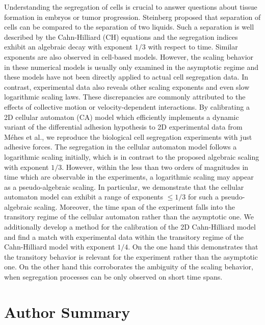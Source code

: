 \documentclass[10pt,letterpaper]{article}
\begin{document}
Understanding the segregation of cells is crucial to answer questions
about tissue formation in embryos or tumor progression. Steinberg
proposed that separation of cells can be compared to the separation of
two liquids. Such a separation is well described by the Cahn-Hilliard
(CH) equations and the segregation indices exhibit an algebraic decay
with exponent $1/3$ with respect to time. Similar exponents are also
observed in cell-based models. However, the scaling behavior in these
numerical models is usually only examined in the asymptotic regime and
these models have not been directly applied to actual cell segregation
data. In contrast, experimental data also reveals other scaling
exponents and even slow logarithmic scaling laws. These discrepancies
are commonly attributed to the effects of collective motion or
velocity-dependent interactions. By calibrating a 2D cellular automaton
(CA) model which efficiently implements a dynamic variant of the
differential adhesion hypothesis to 2D experimental data from Méhes et
al., we reproduce the biological cell segregation experiments with
just adhesive forces. The segregation in the cellular automaton model follows a
logarithmic scaling initially, which is in contrast to the proposed algebraic
scaling with exponent $1/3$. However, within the less than two orders
of magnitudes in time which are observable in the experiments, a
logarithmic scaling may appear as a pseudo-algebraic scaling. In
particular, we demonstrate that the cellular automaton model can exhibit a range of
exponents $\leq 1/3$ for such a pseudo-algebraic scaling. Moreover,
the time span of the experiment falls into the transitory regime of
the cellular automaton rather than the asymptotic one. We additionally develop a
method for the calibration of the 2D Cahn-Hilliard model and find a match with
experimental data within the transitory regime of the Cahn-Hilliard model
with exponent $1/4$. On the one hand this demonstrates that the transitory
behavior is relevant for the experiment rather than the asymptotic
one. On the other hand this corroborates the ambiguity of the scaling
behavior, when segregation processes can be only observed on short time
spans.

\section*{Author Summary}
\end{document}
